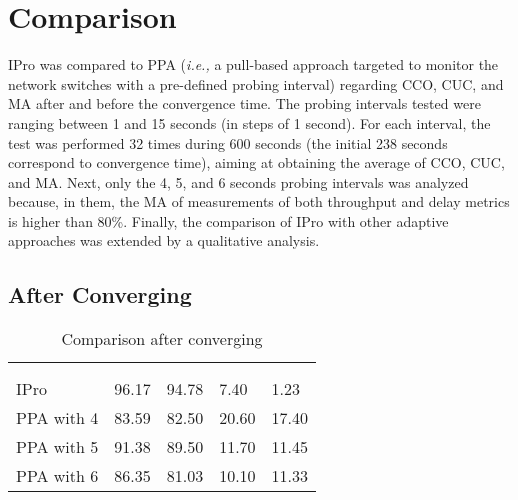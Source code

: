 \section{Comparison}
\label{sec:ipro_performance}
IPro was compared to PPA (\textit{i.e.,} a pull-based approach targeted to monitor the network switches with a pre-defined probing interval) regarding CCO, CUC, and MA after and before the convergence time. The probing intervals tested were ranging between 1 and 15 seconds (in steps of 1 second). For each interval, the test was performed 32 times during 600 seconds (the initial 238 seconds correspond to convergence time), aiming at obtaining the average of CCO, CUC, and MA. Next, only the 4, 5, and 6 seconds probing intervals was analyzed because, in them, the MA of measurements of both throughput and delay metrics is higher than 80\%. Finally, the comparison of IPro with other adaptive approaches was extended by a qualitative analysis.

\subsection{After Converging}
\label{converge}

\fontsize{7}{8}\selectfont
{\renewcommand{\arraystretch}{1.4}
\begin{table*}[!htp]
\scriptsize
\begin{center}
\footnotesize
\begin{tabularx}{\linewidth}{P{30mm}P{30mm}P{28mm}P{28mm}P{28mm}}
\hline
\textbf{}& \textbf{} &\textbf{}&\textbf{}&\textbf{}\\[-2ex]
\textbf{}& \textbf{} &\textbf{}&\textbf{}&\textbf{}\\\hline

 IPro  &  96.17 & 94.78&  7.40 & 1.23  \\\hline
PPA with 4     &  83.59 &  82.50&   20.60 & 17.40  \\\hline
PPA with 5     &  91.38 &  89.50&   11.70 & 11.45  \\\hline
PPA with 6     &  86.35 &  81.03&   10.10 & 11.33  \\\hline
\end{tabularx}
\caption{Comparison after converging}
\label{tab:results_comparison_after}
\end{center}
\end{table*}
}
\normalsize

